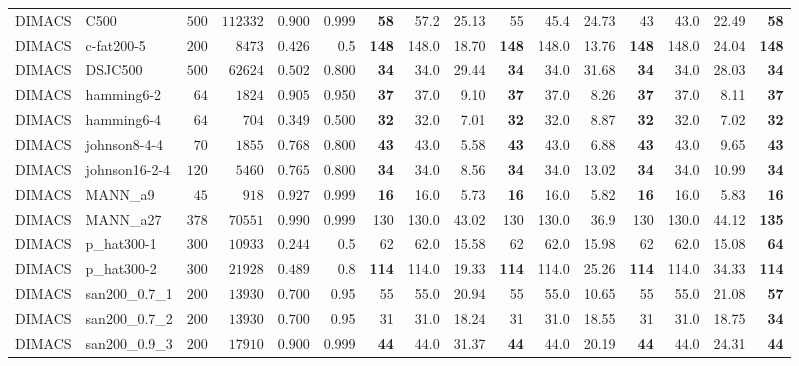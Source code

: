 \documentclass[draft,final]{vutinfth} %
\begin{document}
\begin{table}
{\begin{tabular}{llrrrr | rrr rrr rrr r}
        DIMACS & C500 & $500$ & $112332$ & $0.900$ & 0.999 & \textbf{58} & 57.2 & 25.13 & 55 & 45.4 & 24.73 & 43 & 43.0 & 22.49 & \textbf{58} \\
        DIMACS & c-fat200-5 & $200$ & $8473$ & $0.426$ & 0.5 & \textbf{148} & 148.0 & 18.70 & \textbf{148} & 148.0 & 13.76 & \textbf{148} & 148.0 & 24.04 & \textbf{148}\\
        DIMACS & DSJC500 & $500$ & $62624$ & $0.502$ & 0.800 & \textbf{34} & 34.0 & 29.44 & \textbf{34} & 34.0 & 31.68 & \textbf{34} & 34.0 & 28.03 & \textbf{34}\\
        DIMACS & hamming6-2 & $64$ & $1824$ & $0.905$ & 0.950 & \textbf{37} & 37.0 & 9.10 & \textbf{37} & 37.0 & 8.26  & \textbf{37} & 37.0 & 8.11 & \textbf{37} \\
        DIMACS & hamming6-4 & $64$ & $704$ & $0.349$ & 0.500 & \textbf{32} & 32.0 & 7.01 & \textbf{32} & 32.0 & 8.87  & \textbf{32} & 32.0 & 7.02 & \textbf{32} \\
        DIMACS & johnson8-4-4 & $70$ & $1855$ & $0.768$ & 0.800 & \textbf{43} & 43.0 & 5.58 & \textbf{43} & 43.0 & 6.88  & \textbf{43} & 43.0 & 9.65 & \textbf{43} \\
        DIMACS & johnson16-2-4 & $120$ & $5460$ & $0.765$ & 0.800 & \textbf{34} & 34.0 & 8.56 & \textbf{34} & 34.0 & 13.02  & \textbf{34} & 34.0 & 10.99 & \textbf{34} \\
        DIMACS & MANN\_a9 & $45$ & $918$ & $0.927$ & 0.999 & \textbf{16} & 16.0 & 5.73 & \textbf{16} & 16.0 & 5.82  & \textbf{16} & 16.0 & 5.83 & \textbf{16} \\
        DIMACS & MANN\_a27 & $378$ & $70551$ & $0.990$ & 0.999 & 130 & 130.0 & 43.02 & 130 & 130.0 & 36.9 & 130 & 130.0 & 44.12 & \textbf{135}\\
        DIMACS & p\_hat300-1 & $300$ & $10933$ & $0.244$ & 0.5 & 62 & 62.0 & 15.58 & 62 & 62.0 & 15.98 & 62 & 62.0 & 15.08 & \textbf{64}\\
        DIMACS & p\_hat300-2 & $300$ & $21928$ & $0.489$ & 0.8 & \textbf{114} & 114.0 & 19.33 & \textbf{114} & 114.0 & 25.26 & \textbf{114} & 114.0 & 34.33 & \textbf{114} \\
        DIMACS & san200\_0.7\_1 & $200$ & $13930$ & $0.700$ & 0.95 & 55 & 55.0 & 20.94 & 55 & 55.0 & 10.65 & 55 & 55.0 & 21.08 & \textbf{57}\\
        DIMACS & san200\_0.7\_2 & $200$ & $13930$ & $0.700$ & 0.95 & 31 & 31.0 & 18.24 & 31 & 31.0 & 18.55 & 31 & 31.0 & 18.75 & \textbf{34}\\
        DIMACS & san200\_0.9\_3 & $200$ & $17910$ & $0.900$ & 0.999 & \textbf{44} & 44.0 & 31.37 & \textbf{44} & 44.0 & 20.19 & \textbf{44} & 44.0 & 24.31 & \textbf{44}\\

\end{tabular}}
\end{table}
\end{document}
